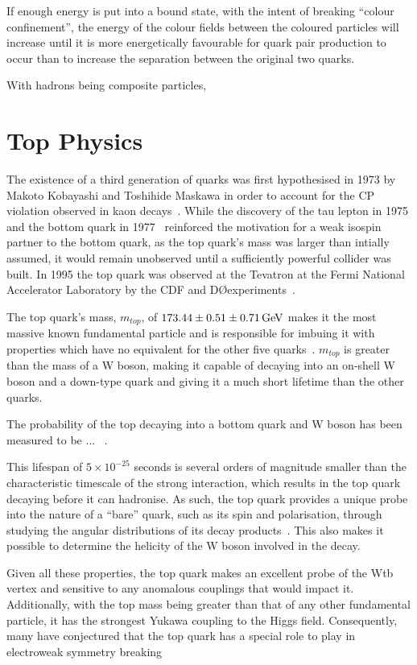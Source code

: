 If enough energy is put into a bound state, with the intent of breaking ``colour confinement'', the energy of the colour fields between the coloured particles will increase until it is more energetically favourable for quark pair production to occur than to increase the separation between the original two quarks\cite{Griffiths}. 


With hadrons being composite particles, 


\section{Top Physics}\label{sec:top-physics}
The existence of a third generation of quarks was first hypothesised in 1973 by Makoto Kobayashi and Toshihide Maskawa in order to account for the CP violation observed in kaon decays~\cite{Kobayashi:1973fv}.
While the discovery of the tau lepton in 1975 and the bottom quark in 1977~\cite{Herb:1977ek} reinforced the motivation for a weak isospin partner to the bottom quark, as the top quark's mass was larger than intially assumed, it would remain unobserved until a sufficiently powerful collider was built.
In 1995 the top quark was observed at the Tevatron at the Fermi National Accelerator Laboratory by the CDF and D\O experiments~\cite{Abe:1995hr,D0:1995jca}.

The top quark's mass, $m_{top}$, of $173.44 \pm 0.51 \pm 0.71 \,\text{Ge\hspace{-.08em}V}$ makes it the most massive known fundamental particle and is responsible for imbuing it with properties which have no equivalent for the other five quarks~\cite{Patrignani:2016xqp}.
$m_{top}$ is greater than the mass of a W boson, making it capable of decaying into an on-shell W boson and a down-type quark and giving it a much short lifetime than the other quarks.

The probability of the top decaying into a bottom quark and W boson has been measured to be ... ~\cite{}.

This lifespan of $5 \times 10^{-25}$ seconds is several orders of magnitude smaller than the characteristic timescale of the strong interaction, which results in the top quark decaying before it can hadronise. 
As such, the top quark provides a unique probe into the nature of a ``bare'' quark, such as its spin and polarisation, through studying the angular distributions of its decay products~\cite{Khachatryan:2015dzz}.
This also makes it possible to determine the helicity of the W boson involved in the decay.

Given all these properties, the top quark makes an excellent probe of the Wtb vertex and sensitive to any anomalous couplings that would impact it.
Additionally, with the top mass being greater than that of any other fundamental particle, it has the strongest Yukawa coupling to the Higgs field.
Consequently, many have conjectured that the top quark has a special role to play in electroweak symmetry breaking~\cite{Giammanco:2017xyn}
 
